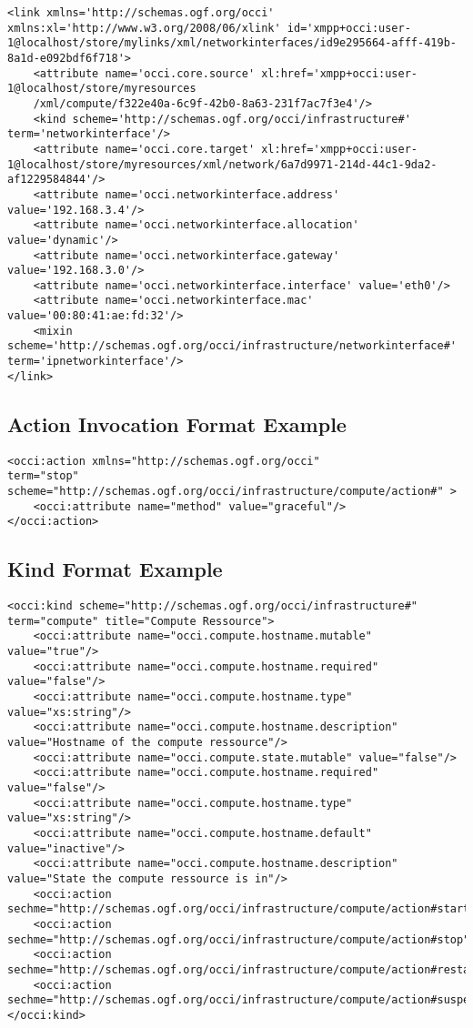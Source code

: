 \documentclass[10pt,a4paper]{article}
\begin{document}
\begin{lstlisting}
<link xmlns='http://schemas.ogf.org/occi' xmlns:xl='http://www.w3.org/2008/06/xlink' id='xmpp+occi:user-1@localhost/store/mylinks/xml/networkinterfaces/id9e295664-afff-419b-8a1d-e092bdf6f718'>
	<attribute name='occi.core.source' xl:href='xmpp+occi:user-1@localhost/store/myresources
	/xml/compute/f322e40a-6c9f-42b0-8a63-231f7ac7f3e4'/>
	<kind scheme='http://schemas.ogf.org/occi/infrastructure#' term='networkinterface'/>
	<attribute name='occi.core.target' xl:href='xmpp+occi:user-1@localhost/store/myresources/xml/network/6a7d9971-214d-44c1-9da2-af1229584844'/>
	<attribute name='occi.networkinterface.address' value='192.168.3.4'/>
	<attribute name='occi.networkinterface.allocation' value='dynamic'/>
	<attribute name='occi.networkinterface.gateway' value='192.168.3.0'/>
	<attribute name='occi.networkinterface.interface' value='eth0'/>
	<attribute name='occi.networkinterface.mac' value='00:80:41:ae:fd:32'/>
	<mixin scheme='http://schemas.ogf.org/occi/infrastructure/networkinterface#' term='ipnetworkinterface'/>
</link>
\end{lstlisting}

\subsection{Action Invocation Format Example}
\label{sec:example_action_invocation}
\begin{lstlisting}
<occi:action xmlns="http://schemas.ogf.org/occi"
term="stop" scheme="http://schemas.ogf.org/occi/infrastructure/compute/action#" >
	<occi:attribute name="method" value="graceful"/>
</occi:action>
\end{lstlisting}

\subsection{Kind Format Example}
\label{sec:example_kind}
\begin{lstlisting}
<occi:kind scheme="http://schemas.ogf.org/occi/infrastructure#" term="compute" title="Compute Ressource">
	<occi:attribute name="occi.compute.hostname.mutable" value="true"/>
	<occi:attribute name="occi.compute.hostname.required" value="false"/>
	<occi:attribute name="occi.compute.hostname.type" value="xs:string"/>
	<occi:attribute name="occi.compute.hostname.description" value="Hostname of the compute ressource"/>
	<occi:attribute name="occi.compute.state.mutable" value="false"/>
	<occi:attribute name="occi.compute.hostname.required" value="false"/>
	<occi:attribute name="occi.compute.hostname.type" value="xs:string"/>
	<occi:attribute name="occi.compute.hostname.default" value="inactive"/>
	<occi:attribute name="occi.compute.hostname.description" value="State the compute ressource is in"/>
	<occi:action sechme="http://schemas.ogf.org/occi/infrastructure/compute/action#start"/>
	<occi:action sechme="http://schemas.ogf.org/occi/infrastructure/compute/action#stop"/>
	<occi:action sechme="http://schemas.ogf.org/occi/infrastructure/compute/action#restart"/>
	<occi:action sechme="http://schemas.ogf.org/occi/infrastructure/compute/action#suspend"/>
</occi:kind>
\end{lstlisting}
\end{document}
